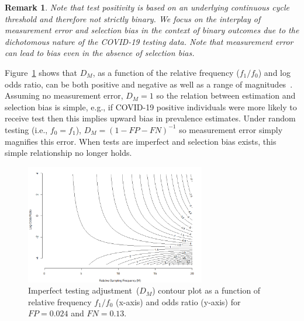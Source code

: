\documentclass[11pt]{amsart}
\numberwithin{equation}{section}
\theoremstyle{plain}
\newtheorem{remark}{Remark}
\begin{document}
 \begin{remark}
 \label{rmk:testbinary}
 Note that test positivity is based on an underlying continuous cycle threshold and therefore not strictly binary.  We focus on the interplay of measurement error and selection bias in the context of binary outcomes due to the dichotomous nature of the COVID-19 testing data.  Note that measurement error can lead to bias even in the absence of selection bias.
 \end{remark}

 Figure~\ref{fig:heatmap} shows that $D_M$, as a function of the relative frequency ($f_1/f_0$) and log odds ratio, can be both positive and negative as well as a range of magnitudes~\citep{Beesley2020,Beesley2019,Smeden2019}. Assuming no measurement error, $D_M = 1$ so the relation between estimation and selection bias is simple, e.g., if COVID-19 positive individuals were more likely to receive test then this implies upward bias in prevalence estimates. Under random testing (i.e., $f_0 = f_1$), $D_M = (1-FP-FN)^{-1}$ so measurement error simply magnifies this error. When tests are imperfect and selection bias exists, this simple relationship no longer holds.

 \begin{figure}[!th]
 \centering
 \includegraphics[width = 0.7\textwidth]{../figs/mem_heatmap.png}
 \caption{Imperfect testing adjustment~($D_M$) contour plot as a function of relative frequency $f_1/f_0$ (x-axis) and odds ratio (y-axis) for $FP=0.024$ and $FN=0.13$.}
 \label{fig:heatmap}
 \vspace{-0.3cm}
 \end{figure}
\end{document}
